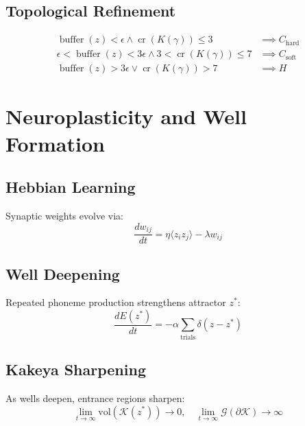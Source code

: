 \documentclass[12pt]{article}
\begin{document}
\subsection{Topological Refinement}

\begin{equation}
\begin{aligned}
\operatorname{buffer}(z) < \epsilon \land \operatorname{cr}(K(\gamma)) \le 3 &\implies C_{\text{hard}} \\
\epsilon < \operatorname{buffer}(z) < 3\epsilon \land 3 < \operatorname{cr}(K(\gamma)) \le 7 &\implies C_{\text{soft}} \\
\operatorname{buffer}(z) > 3\epsilon \lor \operatorname{cr}(K(\gamma)) > 7 &\implies H
\end{aligned}
\end{equation}

\section{Neuroplasticity and Well Formation}

\subsection{Hebbian Learning}

Synaptic weights evolve via:
\begin{equation}
\frac{dw_{ij}}{dt} = \eta \langle z_i z_j \rangle - \lambda w_{ij}
\end{equation}

\subsection{Well Deepening}

Repeated phoneme production strengthens attractor $z^*$:
\begin{equation}
\frac{dE(z^*)}{dt} = -\alpha \sum_{\text{trials}} \delta(z - z^*)
\end{equation}

\subsection{Kakeya Sharpening}

As wells deepen, entrance regions sharpen:
\begin{equation}
\lim_{t \to \infty} \text{vol}(\mathcal{K}(z^*)) \to 0, \quad \lim_{t \to \infty} \mathcal{G}(\partial \mathcal{K}) \to \infty
\end{equation}
\end{document}
